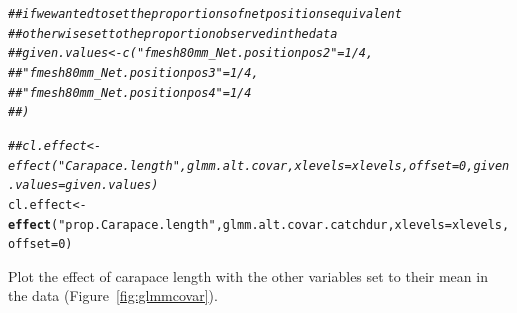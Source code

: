 \documentclass[12pt]{article}\usepackage[]{graphicx}\usepackage[]{color}
\makeatletter
\newcommand{\hlnum}[1]{\textcolor[rgb]{0.686,0.059,0.569}{#1}}%
\newcommand{\hlstr}[1]{\textcolor[rgb]{0.192,0.494,0.8}{#1}}%
\newcommand{\hlcom}[1]{\textcolor[rgb]{0.678,0.584,0.686}{\textit{#1}}}%
\newcommand{\hlstd}[1]{\textcolor[rgb]{0.345,0.345,0.345}{#1}}%
\newcommand{\hlkwb}[1]{\textcolor[rgb]{0.69,0.353,0.396}{#1}}%
\newcommand{\hlkwc}[1]{\textcolor[rgb]{0.333,0.667,0.333}{#1}}%
\newcommand{\hlkwd}[1]{\textcolor[rgb]{0.737,0.353,0.396}{\textbf{#1}}}%
\newenvironment{kframe}{%
 \def\at@end@of@kframe{}%
 \ifinner\ifhmode%
  \def\at@end@of@kframe{\end{minipage}}%
  \begin{minipage}{\columnwidth}%
 \fi\fi%
 \def\FrameCommand##1{\hskip\@totalleftmargin \hskip-\fboxsep
 \colorbox{shadecolor}{##1}\hskip-\fboxsep
     \hskip-\linewidth \hskip-\@totalleftmargin \hskip\columnwidth}%
 \MakeFramed {\advance\hsize-\width
   \@totalleftmargin\z@ \linewidth\hsize
   \@setminipage}}%
 {\par\unskip\endMakeFramed%
 \at@end@of@kframe}
\newenvironment{knitrout}{}{} %
\makeatother
\begin{document}
\begin{knitrout}
\begin{kframe}
\begin{alltt}
\hlcom{## if we wanted to set the proportions of net positions equivalent}
\hlcom{## otherwise set to the proportion observed in the data}
\hlcom{##given.values <- c("fmesh80mm_Net.positionpos2" = 1/4,}
\hlcom{##                  "fmesh80mm_Net.positionpos3" = 1/4,}
\hlcom{##                  "fmesh80mm_Net.positionpos4" = 1/4}
\hlcom{##                  )}

\hlcom{##cl.effect <- effect("Carapace.length", glmm.alt.covar, xlevels = xlevels, offset = 0, given.values = given.values)}
\hlstd{cl.effect} \hlkwb{<-} \hlkwd{effect}\hlstd{(}\hlstr{"prop.Carapace.length"}\hlstd{, glmm.alt.covar.catchdur,} \hlkwc{xlevels} \hlstd{= xlevels,} \hlkwc{offset} \hlstd{=} \hlnum{0}\hlstd{)}
\end{alltt}
\end{kframe}
\end{knitrout}

Plot the effect of carapace length with the other variables set to their mean in the data (Figure~\ref{fig:glmmcovar}).
\end{document}
